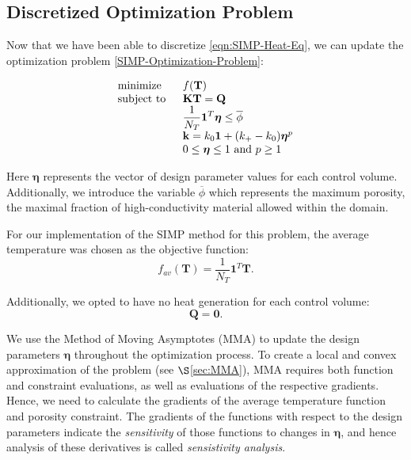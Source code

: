 \subsection{Discretized Optimization Problem}

Now that we have been able to discretize \eqref{eqn:SIMP-Heat-Eq}, we can update the optimization problem \eqref{SIMP-Optimization-Problem}:

\begin{equation}
	\begin{tabular}{ll}
		\text{minimize }   & $f(\mathbf{T})$                                                                                     \\
		\text{subject to } & $\mathbf{K}\mathbf{T}=\mathbf{Q}$                                                                   \\
		                   & $\displaystyle\frac{1}{N_T}\mathbf{1}^T\boldsymbol{\eta}\leq\overline{\phi}$ \\
		                   & $\mathbf{k}=k_0\mathbf{1}+(k_+-k_0)\boldsymbol{\eta}^p$                                       \\
		                   & $0\leq\boldsymbol{\eta}\leq 1\text{ and } p\geq 1$
	\end{tabular}\label{Discretized-SIMP-Optimization-Problem}
\end{equation}

Here $\boldsymbol{\eta}$ represents the vector of design parameter values for each control volume. Additionally, we introduce the variable $\overline{\phi}$ which represents the maximum porosity, the maximal fraction of high-conductivity material allowed within the domain.

For our implementation of the SIMP method for this problem, the average temperature was chosen as the objective function:
\begin{equation}
	f_{av}\left(\mathbf{T}\right)=\frac{1}{N_T}\mathbf{1}^T\mathbf{T}.\label{eqn:f_av}
\end{equation}

Additionally, we opted to have no heat generation for each control volume:
\begin{equation}
	\mathbf{Q}=\mathbf{0}.\label{eqn:Q_vec}
\end{equation}

We use the Method of Moving Asymptotes (MMA) to update the design parameters $\boldsymbol{\eta}$ throughout the optimization process. To create a local and convex approximation of the problem (see $\S$\ref{sec:MMA}), MMA requires both function and constraint evaluations, as well as evaluations of the respective gradients. Hence, we need to calculate the gradients of the average temperature function and porosity constraint. The gradients of the functions with respect to the design parameters indicate the \textit{sensitivity} of those functions to changes in $\boldsymbol{\eta}$, and hence analysis of these derivatives is called \textit{sensistivity analysis}.

